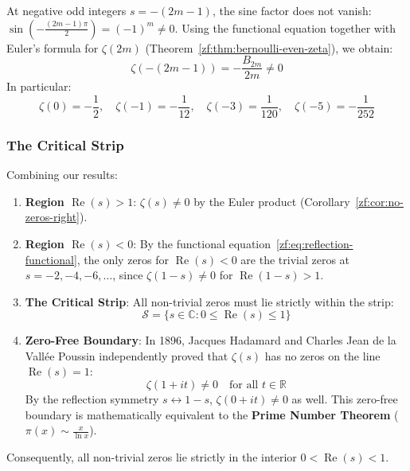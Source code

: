 \documentclass[a4paper]{article}
\begin{document}
\begin{remark}
At negative odd integers $s = -(2m-1)$, the sine factor does not vanish: $\sin\left(-\frac{(2m-1)\pi}{2}\right) = (-1)^m \ne 0$. Using the functional equation together with Euler's formula for $\zeta(2m)$ (Theorem~\ref{zf:thm:bernoulli-even-zeta}), we obtain:
\begin{equation}
    \label{zf:eq:negative-odd-zeta}
    \zeta(-(2m-1)) = -\frac{B_{2m}}{2m} \ne 0
\end{equation}
In particular:
\begin{equation*}
    \zeta(0) = -\frac{1}{2}, \quad \zeta(-1) = -\frac{1}{12}, \quad \zeta(-3) = \frac{1}{120}, \quad \zeta(-5) = -\frac{1}{252}
\end{equation*}
\end{remark}

\subsubsection{The Critical Strip}
Combining our results:
\begin{enumerate}
    \item \textbf{Region $\operatorname{Re}(s) > 1$}: $\zeta(s) \ne 0$ by the Euler product (Corollary~\ref{zf:cor:no-zeros-right}).
    \item \textbf{Region $\operatorname{Re}(s) < 0$}: By the functional equation~\eqref{zf:eq:reflection-functional}, the only zeros for $\operatorname{Re}(s) < 0$ are the trivial zeros at $s = -2, -4, -6, \dots$, since $\zeta(1-s) \ne 0$ for $\operatorname{Re}(1-s) > 1$.
    \item \textbf{The Critical Strip}: All non-trivial zeros must lie strictly within the strip:
    \begin{equation}
        \mathcal{S} = \{ s \in \mathbb{C} : 0 \le \operatorname{Re}(s) \le 1 \}
    \end{equation}
    \item \textbf{Zero-Free Boundary}: In 1896, Jacques Hadamard and Charles Jean de la Vallée Poussin independently proved that $\zeta(s)$ has no zeros on the line $\operatorname{Re}(s) = 1$:
    \begin{equation*}
        \zeta(1 + it) \ne 0 \quad \text{for all } t \in \mathbb{R}
    \end{equation*}
    By the reflection symmetry $s \leftrightarrow 1-s$, $\zeta(0 + it) \ne 0$ as well. This zero-free boundary is mathematically equivalent to the \textbf{Prime Number Theorem} ($\pi(x) \sim \frac{x}{\ln x}$).
\end{enumerate}
Consequently, all non-trivial zeros lie strictly in the interior $0 < \operatorname{Re}(s) < 1$.
\end{document}
